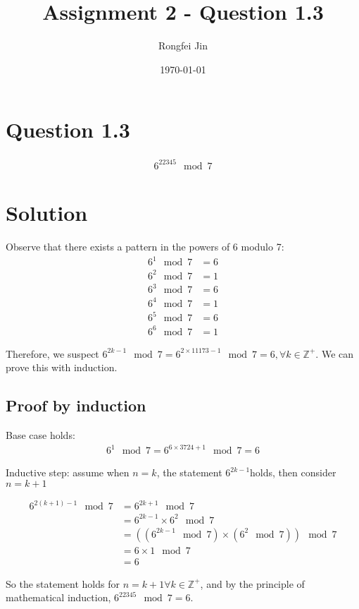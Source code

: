 \documentclass{article}
\author{Rongfei Jin}
\title{Assignment 2 - Question 1.3}
\date{\today}
\begin{document}
\section{Question 1.3}
\begin{align*}
    6^{22345} \mod 7
\end{align*}
\section{Solution}
Observe that there exists a pattern in the powers of 6 modulo 7:
\begin{align*}
    6^1 \mod 7 &= 6 \\
    6^2 \mod 7 &= 1 \\
    6^3 \mod 7 &= 6 \\
    6^4 \mod 7 &= 1 \\
    6^5 \mod 7 &= 6 \\
    6^6 \mod 7 &= 1
\end{align*}

Therefore, we suspect $6^{2k-1} \mod 7 = 6^{2 \times 11173 - 1} \mod 7 = 6,\forall k\in \mathbb{Z^+}$.
We can prove this with induction.

\subsection{Proof by induction}
Base case holds:
\begin{align*}
    6^{1} \mod 7 = 6^{6 \times 3724 + 1} \mod 7 = 6
\end{align*}

\noindent
Inductive step: assume when $n = k$, the statement $6^{2k-1} $holds, then consider $n=k+1$

\begin{align*}
    6^{2(k+1)-1} \mod 7 &= 6^{2k+1} \mod 7 \\
    &= 6^{2k-1} \times 6^2 \mod 7 \\
    &= ((6^{2k-1} \mod 7) \times (6^2 \mod 7)) \mod 7\\
    &= 6 \times 1 \mod 7 \\
    &= 6
\end{align*}

So the statement holds for $n = k+1 \forall k \in \mathbb{Z^+}$, and by the principle of mathematical induction, $6^{22345} \mod 7 = 6$.
\end{document}
